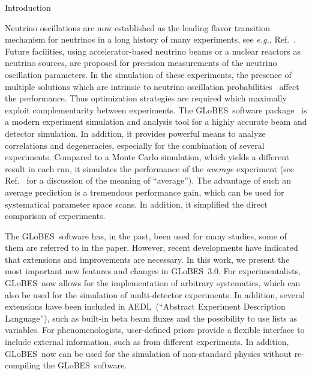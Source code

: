 \documentclass[12pt,a4paper]{article}
\makeatletter
\renewcommand{\section}{\@startsection{section}{1}{0em}{-\baselineskip}%
{\baselineskip}{\normalfont\large\bfseries}}
\newcommand{\eg}{{\it e.g.}}
\newcommand{\Ref}{Ref.}
\newcommand{\GLOBES}{{\sf GLoBES}}
\newcommand{\GLOBESN}{{\sf GLoBES~3.0}}
\newcommand{\AEDL}{{\sf AEDL}}
\makeatother
\begin{document}
\section{Introduction}

Neutrino oscillations are now established as the leading flavor
transition mechanism for neutrinos in a long history of many experiments, see
\eg , \Ref~\cite{Barger:2003qi}. Future facilities, using accelerator-based
 neutrino beams or a nuclear reactors as neutrino sources, are proposed
for precision measurements of the neutrino oscillation parameters. In the
simulation of these experiments, 
the presence of multiple solutions which are intrinsic to
 neutrino oscillation probabilities~\cite{Fogli:1996pv,Burguet-Castell:2001ez,Minakata:2001qm,Barger:2001yr} 
affect the performance.
Thus optimization strategies are required which maximally exploit 
complementarity between experiments. The \GLOBES\ software package~\cite{Huber:2004ka}
is a  modern experiment  simulation  and analysis tool for
a highly accurate beam and detector simulation. In addition, it provides powerful 
means to analyze correlations and degeneracies, especially for the combination
of several experiments. Compared to a Monte Carlo simulation, which yields a different
result in each run, it simulates the performance of the {\em average} experiment
(see \Ref~\cite{Schwetz:2006md} for a discussion of the meaning of ``average'').
The advantage of such an average prediction is a tremendous performance gain,
which can be used for systematical parameter space scans. In addition, it 
simplified the direct comparison of experiments.

The \GLOBES\ software has, in the past, been used for many studies, some of them
are referred to in the paper. However, recent developments have indicated that extensions
and improvements are necessary. In this work, we present the most important new
features and changes in \GLOBESN . For experimentalists, \GLOBES\ now allows
for the implementation of arbitrary systematics, which can also be used for
the simulation of multi-detector experiments. In addition, several extensions
have been included in \AEDL\ (``Abstract Experiment Description Language''), such as
built-in beta beam fluxes and the possibility to use lists as variables.
For phenomenologists, user-defined
priors provide a flexible interface to include external information, such as from
different experiments. In addition, \GLOBES\ now can be used for the simulation
of non-standard physics without re-compiling the \GLOBES\ software.
\end{document}
